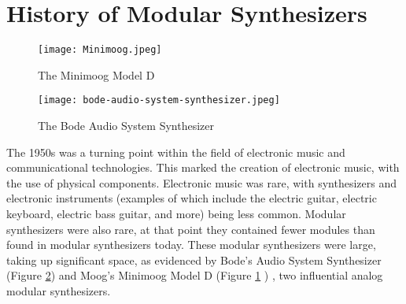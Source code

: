 \section[History of Modular Synthesizers]{History of Modular Synthesizers}\label{section:mod-synth-history}

\begin{figure}
  \centering
  \texttt{[image: Minimoog.jpeg]}
  \caption{The Minimoog Model D}
  \label{fig:minimoog}
\end{figure}

\begin{figure}
  \centering
  \texttt{[image: bode-audio-system-synthesizer.jpeg]}
  \caption{The Bode Audio System Synthesizer}
  \label{fig:bode-audio-system-synthesizer}
\end{figure}


The 1950s was a turning point within the field of electronic music and communicational technologies. This marked the creation of electronic music, with the use of physical components. Electronic music was rare, with synthesizers and electronic instruments (examples of which include the electric guitar, electric keyboard, electric bass guitar, and more) being less common. Modular synthesizers were also rare, at that point they contained fewer modules than found in modular synthesizers today. These modular synthesizers were large, taking up significant space, as evidenced by Bode's Audio System Synthesizer (Figure \ref{fig:bode-audio-system-synthesizer}) \cite{Crab_2019a} \cite{Says_2014} and Moog's Minimoog Model D (Figure \ref{fig:minimoog} \cite{Krash_2005}) \cite{Pinch_Trocco_1998} \cite{Pinch_Trocco_2004}, two influential analog modular synthesizers.

